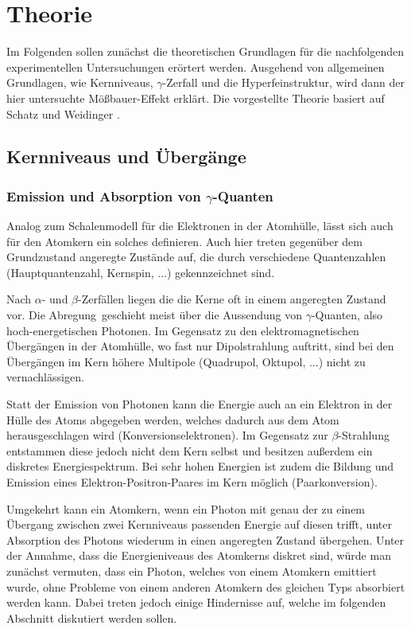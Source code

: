 \section{Theorie}
	
	Im Folgenden sollen zunächst die theoretischen Grundlagen für die nachfolgenden experimentellen Untersuchungen erörtert werden. Ausgehend von allgemeinen Grundlagen, wie Kernniveaus, $\gamma$-Zerfall und die Hyperfeinstruktur, wird dann der hier untersuchte Mößbauer-Effekt erklärt. Die vorgestellte Theorie basiert auf Schatz und Weidinger \cite{schatz}.
	
	\subsection{Kernniveaus und Übergänge}
	
	\subsubsection{Emission und Absorption von $\gamma$-Quanten}
	
	Analog zum Schalenmodell für die Elektronen in der Atomhülle, lässt sich auch für den Atomkern ein solches definieren. Auch hier treten gegenüber dem Grundzustand angeregte Zustände auf, die durch verschiedene Quantenzahlen (Hauptquantenzahl, Kernspin, ...) gekennzeichnet sind.
	
	Nach $\alpha$- und $\beta$-Zerfällen liegen die die Kerne oft in einem angeregten Zustand vor. Die \glqq Abregung\grqq\ geschieht meist über die Aussendung von $\gamma$-Quanten, also hoch-energetischen Photonen. Im Gegensatz zu den elektromagnetischen Übergängen in der Atomhülle, wo fast nur Dipolstrahlung auftritt, sind bei den Übergängen im Kern höhere Multipole (Quadrupol, Oktupol, ...) nicht zu vernachlässigen. 
	
	\noindent Statt der Emission von Photonen kann die Energie auch an ein Elektron in der Hülle des Atoms abgegeben werden, welches dadurch aus dem Atom herausgeschlagen wird (Konversionselektronen). Im Gegensatz zur $\beta$-Strahlung entstammen diese jedoch nicht dem Kern selbst und besitzen außerdem ein diskretes Energiespektrum. Bei sehr hohen Energien ist zudem die Bildung und Emission eines Elektron-Positron-Paares im Kern möglich (Paarkonversion).
	
	Umgekehrt kann ein Atomkern, wenn ein Photon mit genau der zu einem Übergang zwischen zwei Kernniveaus passenden Energie auf diesen trifft, unter Absorption des Photons wiederum in einen angeregten Zustand übergehen. Unter der Annahme, dass die Energieniveaus des Atomkerns diskret sind, würde man zunächst vermuten, dass ein Photon, welches von einem Atomkern emittiert wurde, ohne Probleme von einem anderen Atomkern des gleichen Typs absorbiert werden kann. Dabei treten jedoch einige Hindernisse auf, welche im folgenden Abschnitt diskutiert werden sollen.
	
